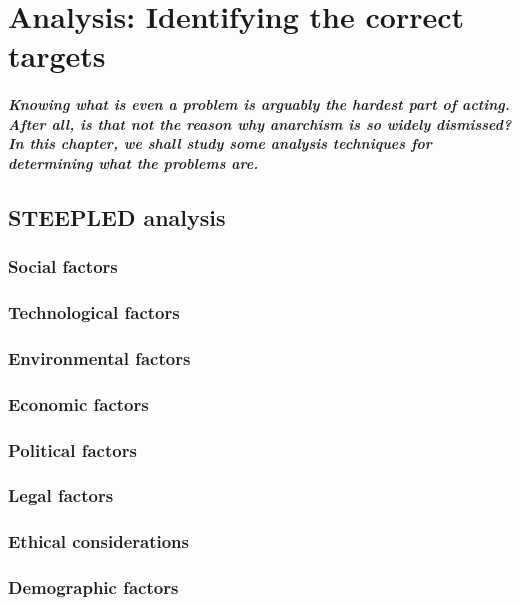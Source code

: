 \chapter{Analysis: Identifying the correct targets}
    \paragraph{Knowing what is even a problem is arguably the hardest part of acting. After all, is that not the reason why anarchism is so widely dismissed? In this chapter, we shall study some analysis techniques for determining what the problems are.}
    \section{STEEPLED analysis}
    	\subsection{Social factors}
        \subsection{Technological factors}
        \subsection{Environmental factors}
        \subsection{Economic factors}
        \subsection{Political factors}
        \subsection{Legal factors}
        \subsection{Ethical considerations}
        \subsection{Demographic factors}